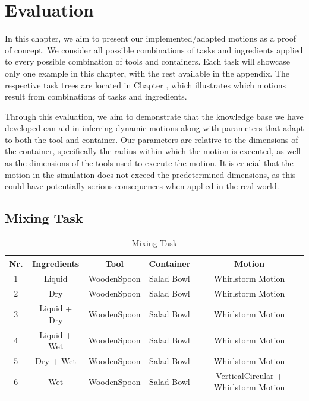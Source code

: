 \section{Evaluation}

In this chapter, we aim to present our implemented/adapted motions as a proof of concept. We consider all possible combinations of tasks and ingredients applied to every possible combination of tools and containers. Each task will showcase only one example in this chapter, with the rest available in the appendix. The respective task trees are located in Chapter , which illustrates which motions result from combinations of tasks and ingredients.

Through this evaluation, we aim to demonstrate that the knowledge base we have developed can aid in inferring dynamic motions along with parameters that adapt to both the tool and container. Our parameters are relative to the dimensions of the container, specifically the radius within which the motion is executed, as well as the dimensions of the tools used to execute the motion. It is crucial that the motion in the simulation does not exceed the predetermined dimensions, as this could have potentially serious consequences when applied in the real world.
\subsection{Mixing Task}

\begin{table}[H]
    \centering
    \begin{tabular}{|c|c|c|c|c|}
      \hline
      \textbf{Nr.} & \textbf{Ingredients} & \textbf{Tool} & \textbf{Container} & \textbf{Motion}  \\
      \hline
      1 & Liquid & WoodenSpoon & Salad Bowl & Whirlstorm Motion \\
      \hline
      2 & Dry & WoodenSpoon & Salad Bowl & Whirlstorm Motion \\
      \hline
      3 & Liquid + Dry & WoodenSpoon & Salad Bowl & Whirlstorm Motion \\
      \hline
      4 & Liquid + Wet & WoodenSpoon & Salad Bowl & Whirlstorm Motion \\
      \hline
      5 & Dry + Wet & WoodenSpoon & Salad Bowl & Whirlstorm Motion \\
      \hline
      6 & Wet & WoodenSpoon & Salad Bowl & VerticalCircular + Whirlstorm Motion \\
      \hline
    \end{tabular}
    \caption{Mixing Task}
    \label{tab:mixingtask}
  \end{table}

